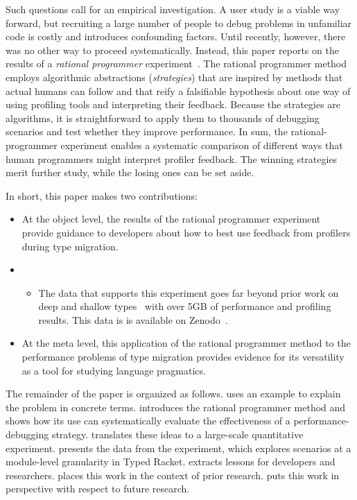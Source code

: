 Such questions call for an empirical investigation.
A user study is a viable way forward, but recruiting a large number
of people to debug problems in unfamiliar code is costly and introduces
confounding factors.
Until recently, however, there was no other way to proceed systematically.
Instead, this paper reports on the results of a \emph{rational programmer}
experiment~\cite{lksfd-popl-2020,lgfd-icfp-2021,lgfd-icfp-2023}.
The rational programmer method employs algorithmic abstractions (\emph{strategies})
that are inspired by methods that actual humans can follow and that reify a
falsifiable hypothesis about one way of using profiling tools and
interpreting their feedback.
Because the strategies are algorithms, it is straightforward to apply them
to thousands of debugging scenarios and test whether they improve performance.
In sum, the rational-programmer experiment enables a systematic comparison
of different ways that human programmers might interpret profiler feedback.
The winning strategies merit further study, while the losing ones can be
set aside.

In short, this paper makes two contributions:
\begin{itemize}

\item At the object level, the results of the rational programmer experiment
 provide guidance to developers about how to best use feedback from
 profilers during type migration.

    \item[]\begin{itemize}
      \item
        The data that supports this experiment goes far beyond prior work
        on deep and shallow types~\cite{g-deep-shallow} with over 5GB of
        performance and profiling results.
        This data is is available on Zenodo~\cite{gdf-artifact-2023}.
    \end{itemize}

\item At the meta level, this application of the rational programmer method to
 the performance problems of type migration provides evidence for its versatility
 as a tool for studying language pragmatics.

\end{itemize}
The remainder of the paper is organized as follows.  
uses an example to explain the problem in concrete terms. 
introduces the rational programmer method and shows how its use can systematically
evaluate the effectiveness of a performance-debugging strategy.
 translates these ideas to a
large-scale quantitative experiment.
 presents the data from the experiment, which
explores scenarios at a module-level granularity in Typed Racket.
 extracts lessons for developers and researchers.
 places this work in the context of prior research.
 puts this work in perspective with respect to future
research.
